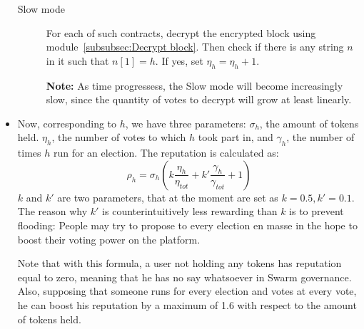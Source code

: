 \documentclass[submission, copyright,creativecommons,sharealike,noncommercial]{eptcs}
\begin{document}
\begin{itemize}
\begin{description}
			\item[Slow mode] For each of such contracts, decrypt the encrypted block using module~\ref{subsubsec:Decrypt block}. Then check if there is any string $n$ in it such that $n[1]=h$. If yes, set $\eta_{h} = \eta_{h}+1$.
			
			\textbf{Note:} As time progressess, the Slow mode will become increasingly slow, since the quantity of votes to decrypt will grow at least linearly.
		\end{description}


		\item Now, corresponding to $h$, we have three parameters: $\sigma_h$, the amount of tokens held. $\eta_h$, the number of votes to which $h$ took part in, and $\gamma_h$, the number of times $h$ run for an election. The reputation is calculated as:
		\[
		\rho_h = \sigma_h\left( k \frac{\eta_h}{\eta_{tot}} + k' \frac{\gamma_h}{\gamma_{tot}} + 1\right)
		\]
		$k$ and $k'$ are two parameters, that at the moment are set as $k=0.5, k'=0.1$. The reason why $k'$ is counterintuitively less rewarding than $k$ is to prevent flooding: People may try to propose to every election en masse in the hope to boost their voting power on the platform. 
		
		Note that with this formula, a user not holding any tokens has reputation equal to zero, meaning that he has no say whatsoever in Swarm governance. Also, supposing that someone runs for every election and votes at every vote, he can boost his reputation by a maximum of 1.6 with respect to the amount of tokens held.
	\end{itemize}
\end{document}
